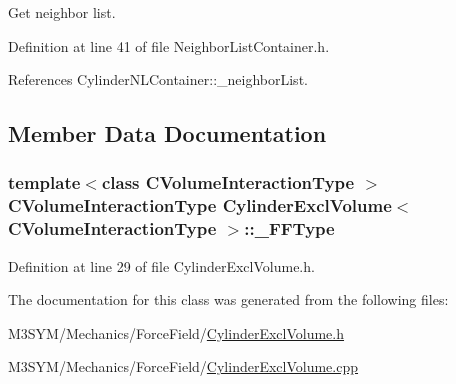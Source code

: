 Get neighbor list. 



Definition at line 41 of file Neighbor\+List\+Container.\+h.



References Cylinder\+N\+L\+Container\+::\+\_\+neighbor\+List.



\subsection{Member Data Documentation}
\hypertarget{classCylinderExclVolume_a715ac884a949e7be970e7ffb636d60c9}{
\subsubsection[{\+\_\+\+F\+F\+Type}]{\setlength{\rightskip}{0pt plus 5cm}template$<$class C\+Volume\+Interaction\+Type $>$ C\+Volume\+Interaction\+Type {\bf Cylinder\+Excl\+Volume}$<$ C\+Volume\+Interaction\+Type $>$\+::\+\_\+\+F\+F\+Type\hspace{0.3cm}{\ttfamily [private]}}}\label{classCylinderExclVolume_a715ac884a949e7be970e7ffb636d60c9}


Definition at line 29 of file Cylinder\+Excl\+Volume.\+h.



The documentation for this class was generated from the following files\+:\begin{DoxyCompactItemize}
\item 
M3\+S\+Y\+M/\+Mechanics/\+Force\+Field/\hyperlink{CylinderExclVolume_8h}{Cylinder\+Excl\+Volume.\+h}\item 
M3\+S\+Y\+M/\+Mechanics/\+Force\+Field/\hyperlink{CylinderExclVolume_8cpp}{Cylinder\+Excl\+Volume.\+cpp}\end{DoxyCompactItemize}
